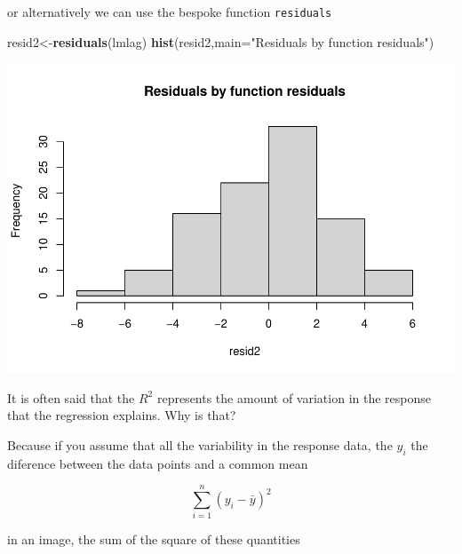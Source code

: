 \documentclass[
]{book}
\newenvironment{Shaded}{\begin{snugshade}}{\end{snugshade}}
\newcommand{\AttributeTok}[1]{\textcolor[rgb]{0.13,0.29,0.53}{#1}}
\newcommand{\CommentTok}[1]{\textcolor[rgb]{0.56,0.35,0.01}{\textit{#1}}}
\newcommand{\DecValTok}[1]{\textcolor[rgb]{0.00,0.00,0.81}{#1}}
\newcommand{\FunctionTok}[1]{\textcolor[rgb]{0.13,0.29,0.53}{\textbf{#1}}}
\newcommand{\NormalTok}[1]{#1}
\newcommand{\OtherTok}[1]{\textcolor[rgb]{0.56,0.35,0.01}{#1}}
\newcommand{\SpecialCharTok}[1]{\textcolor[rgb]{0.81,0.36,0.00}{\textbf{#1}}}
\newcommand{\StringTok}[1]{\textcolor[rgb]{0.31,0.60,0.02}{#1}}
\begin{document}
or alternatively we can use the bespoke function \texttt{residuals}

\begin{Shaded}
\begin{Highlighting}[]
\NormalTok{resid2}\OtherTok{\textless{}{-}}\FunctionTok{residuals}\NormalTok{(lmlag)}
\FunctionTok{hist}\NormalTok{(resid2,}\AttributeTok{main=}\StringTok{"Residuals by function residuals"}\NormalTok{)}
\end{Highlighting}
\end{Shaded}

\includegraphics{ECOMODbook_files/figure-latex/a6.13-1.pdf}

It is often said that the \(R^2\) represents the amount of variation in the response that the regression explains. Why is that?

Because if you assume that all the variability in the response data, the \(y_i\) the diference between the data points and a common mean

\[\sum_{i=1}^n (y_i- \bar y)^2\]

in an image, the sum of the square of these quantities

\begin{Shaded}
\end{Shaded}
\end{document}
